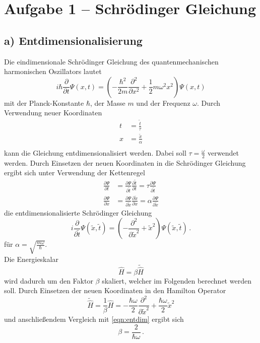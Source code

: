 \section{Aufgabe 1 – Schrödinger Gleichung}

\subsection{a) Entdimensionalisierung}
Die eindimensionale Schrödinger Gleichung des quantenmechanischen harmonischen Oszillators lautet
\begin{equation}
    i \hbar \frac{\partial}{\partial t} \Psi(x,t) = \left( - \frac{\hbar^2}{2m} \frac{\partial^2}{\partial x^2} + \frac{1}{2} m \omega^2 x^2 \right) \Psi(x,t)
\end{equation}
mit der Planck-Konstante $\hbar$, der Masse $m$ und der Frequenz $\omega$.
Durch Verwendung neuer Koordinaten
\begin{align}
    t &= \frac{\tilde{t}}{\tau} \\
    x &= \frac{\tilde{x}}{\alpha} \\
\end{align}
kann die Gleichung entdimensionalisiert werden.
Dabei soll $\tau = \frac{\omega}{2}$ verwendet werden.
Durch Einsetzen der neuen Koordinaten in die Schrödinger Gleichung ergibt sich unter Verwendung der Kettenregel
\begin{align}
    \frac{\partial \Psi}{\partial t} &= \frac{\partial \Psi}{\partial \tilde{t}} \frac{\partial \tilde{t}}{\partial t} = \tau \frac{\partial \Psi}{\partial \tilde{t}} \\
    \frac{\partial \Psi}{\partial x} &= \frac{\partial \Psi}{\partial \tilde{x}} \frac{\partial \tilde{x}}{\partial x} = \alpha \frac{\partial \Psi}{\partial \tilde{x}}
\end{align}
die entdimensionalisierte Schrödinger Gleichung
\begin{equation}
    \label{eqn:entdim}
    i \frac{\partial}{\partial \tilde{t}} \Psi(\tilde{x},\tilde{t}) = \left(-\frac{\partial^2}{\partial \tilde{x}^2} + \tilde{x}^2 \right) \Psi(\tilde{x},\tilde{t}) \, .
\end{equation}
für $\alpha = \sqrt{\frac{m \omega}{\hbar}}$.
\\
Die Energieskalar 
\begin{equation}
    \hat{H} = \beta \tilde{\hat{H}}
\end{equation}
wird dadurch um den Faktor $\beta$ skaliert, welcher im Folgenden berechnet werden soll.
Durch Einsetzen der neuen Koordinaten in den Hamilton Operator
\begin{equation}
    \tilde{\hat{H}} = \frac{1}{\beta} \hat{H} = - \frac{\hbar \omega}{2} \frac{\partial^2}{\partial \tilde{x}^2} + \frac{\hbar \omega}{2} \tilde{x}^2
\end{equation}
und anschließendem Vergleich mit \autoref{eqn:entdim} ergibt sich
\begin{equation}
    \beta = \frac{2}{\hbar \omega} \, .
\end{equation}

